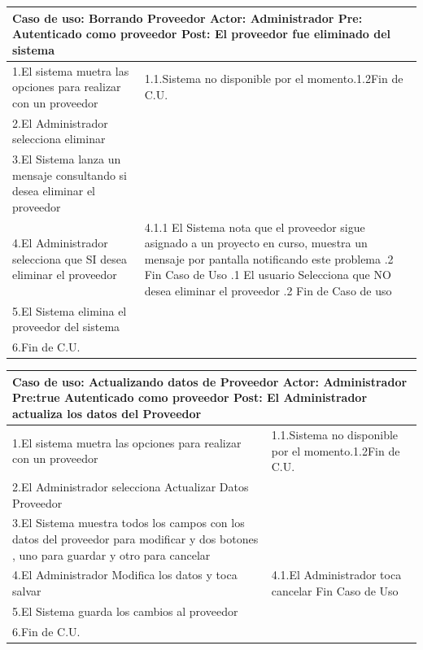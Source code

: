 \begin{longtable}{| p{} | p{} |} 
    \hline
    \multicolumn{2}{|p{16cm}|}{
        \textbf{Caso de uso:} Borrando Proveedor \newline
        \textbf{Actor:} Administrador\newline
        \textbf{Pre:}  Autenticado como proveedor\newline
        \textbf{Post:} El proveedor fue eliminado del sistema
    }\\
    \hline
    1.El sistema  muetra las opciones para realizar con un proveedor & 1.1.Sistema no  disponible por el momento.\newline 1.2Fin de C.U.\\
    \hline
    2.El Administrador selecciona eliminar& \\
    \hline
    3.El Sistema lanza un mensaje consultando si desea eliminar el proveedor &  \\
    \hline
    4.El Administrador selecciona que SI desea eliminar el proveedor & 4.1.1 El Sistema nota que el proveedor sigue asignado a un proyecto en curso, muestra un mensaje por pantalla notificando este problema \newline 4.1.2 Fin Caso de Uso \newline 4.2.1 El usuario Selecciona que NO desea eliminar el proveedor \newline4.2.2 Fin de Caso de uso\\
    \hline
    5.El Sistema elimina el proveedor del sistema &  \\
    \hline
    6.Fin de C.U.& \\
    \hline
\end{longtable}
\begin{longtable}{|p{}|p{}|}
    \hline
    \multicolumn{2}{|p{16cm}|}{
        \textbf{Caso de uso:} Actualizando datos de Proveedor \newline
        \textbf{Actor:} Administrador\newline
        \textbf{Pre:true }  Autenticado como proveedor\newline
        \textbf{Post:} El Administrador actualiza los datos del Proveedor
    }\\
    \hline
    1.El sistema  muetra las opciones para realizar con un proveedor & 1.1.Sistema no  disponible por el momento.\newline 1.2Fin de C.U.\\
    \hline
    2.El Administrador selecciona Actualizar Datos Proveedor&   \\
    \hline
    3.El Sistema muestra todos los campos con los datos del proveedor para modificar y dos botones , uno para guardar y otro para cancelar&  \\
    \hline
    4.El Administrador Modifica los datos y toca salvar & 4.1.El Administrador toca cancelar \newline 4.2 Fin Caso de Uso \\
    \hline
    5.El Sistema guarda los cambios al proveedor &  \\
    \hline
    6.Fin de C.U.& \\
    \hline
\end{longtable}

